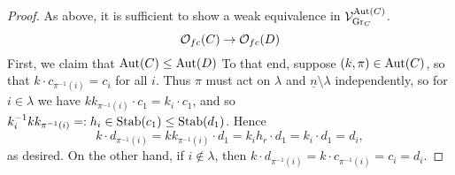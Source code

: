 \documentclass[a4paper,10pt
,draft
]{article}%
\renewcommand{\1}{\eta}%
\begin{document}
\begin{proof}
      As above, it is sufficient to show a weak equivalence in $\mathcal V^{\operatorname{Aut}(C)}_{\mathrm{Gr}_C}$.
      \[
            \mathcal{O}_{fc}(C) \to \mathcal{O}_{fc}(D)
      \]
      First, we claim that $\operatorname{Aut}(C) \leq \operatorname{Aut}(D)$
      To that end, suppose $(k,\pi)\in \operatorname{Aut}(C)$, so that $k \cdot c_{\pi^{-1}(i)} = c_i$ for all $i$.
      Thus $\pi$ must act on $\lambda$ and $\underline{n} \setminus \lambda$ independently,
      so for $i \in \lambda$ we have %
      $k k_{\pi^{-1}(i)} \cdot c_1 = k_i \cdot c_1$, and so
      $k_i^{-1} k k_{\pi^{-1}(i)} =:h_i \in \mathrm{Stab}(c_1) \leq \mathrm{Stab}(d_1)$. Hence 
      \begin{equation}
            \label{STAB_KT_EQ}
            k \cdot d_{\pi^{-1}(i)} = k k_{\pi^{-1}(i)} \cdot d_1 = k_i h_r \cdot d_1 = k_i \cdot d_1 = d_i,
      \end{equation}
      as desired.
      On the other hand, if $i \not \in \lambda$, then
      $k \cdot d_{\pi^{-1}(i)} = k \cdot c_{\pi^{-1}(i)} = c_i = d_i$.
      

\end{proof}
\end{document}
